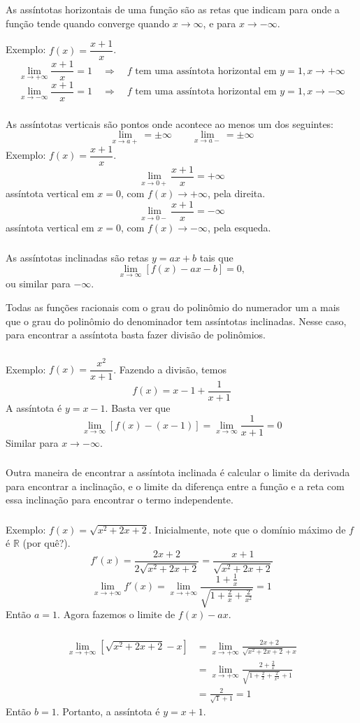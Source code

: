 \documentclass[10 pt]{beamer}
\newcommand{\myframe}[1]{
\begin{frame}
 \frametitle{\insertsection \qquad {\small \insertsubsection}}
#1
\end{frame}}
\newcommand{\limx}[1]{\lim_{x\rightarrow{#1}}}
\begin{document}
\myframe {
  As assíntotas horizontais de uma função são as retas que indicam
  para onde a função tende quando converge quando $x\rightarrow\infty$,
  e para $x\rightarrow-\infty$.

  Exemplo: $f(x) = \dfrac{x+1}{x}$.
  $$ \limx{+\infty}\frac{x+1}{x} = 1 \quad
      \Longrightarrow \quad \mbox{$f$ tem uma assíntota horizontal em } 
        y=1, x\rightarrow+\infty$$
  $$ \limx{-\infty}\frac{x+1}{x} = 1 \quad
      \Longrightarrow \quad \mbox{$f$ tem uma assíntota horizontal em } 
        y=1, x\rightarrow-\infty$$
}

\myframe {
  As assíntotas verticais são pontos onde acontece ao menos um dos seguintes:
  $$ \limx{a+} = \pm\infty \qquad \limx{a-} = \pm\infty $$
  Exemplo: $f(x) = \dfrac{x+1}{x}$.
  $$ \limx{0+}\frac{x+1}{x} = +\infty $$
    assíntota vertical em $x = 0$, com $f(x)\rightarrow+\infty$, pela direita.
  $$ \limx{0-}\frac{x+1}{x} = -\infty $$
    assíntota vertical em $x = 0$, com $f(x)\rightarrow-\infty$, pela esqueda.
}

\myframe {
  As assíntotas inclinadas são retas $y = ax+b$ tais que
  $$ \limx{\infty}[f(x) - ax-b] = 0, $$
  ou similar para $-\infty$.

  Todas as funções racionais com o grau do polinômio do numerador um a mais
  que o grau do polinômio do denominador tem assíntotas inclinadas.
  Nesse caso, para encontrar a assíntota basta fazer divisão de polinômios.
}

\myframe {
  Exemplo: $f(x) = \dfrac{x^2}{x+1}$. Fazendo a divisão, temos
  $$ f(x) = x-1 + \frac{1}{x+1} $$
  A assíntota é $y = x-1$. Basta ver que
  $$ \limx{\infty}[f(x)-(x-1)] = \limx{\infty}\frac{1}{x+1} = 0 $$
  Similar para $x \rightarrow-\infty$.
}

\myframe {
  Outra maneira de encontrar a assíntota inclinada é calcular o limite
  da derivada para encontrar a inclinação, e o limite da diferença
  entre a função e a reta com essa inclinação para encontrar o termo
  independente.
}

\myframe {
  Exemplo: $f(x) = \sqrt{x^2 + 2x + 2}$. Inicialmente, note que o domínio
  máximo de $f$ é $\mathbb{R}$ (por quê?).
  $$ f'(x) = \frac{2x + 2}{2\sqrt{x^2 + 2x + 2}} = \frac{x+1}{\sqrt{x^2+2x+2}} $$
  $$ \limx{+\infty}f'(x) = 
    \limx{+\infty}\frac{1+\frac{1}{x}}{\sqrt{1+\frac{2}{x}+\frac{2}{x^2}}} = 1$$
  Então $a = 1$. Agora fazemos o limite de $f(x) - ax$.
}

\myframe {
  \begin{align*}
    \limx{+\infty} [\sqrt{x^2+2x+2} - x] 
      & = \limx{+\infty} \frac{2x+2}{\sqrt{x^2+2x+2}+x} \\
      & = \limx{+\infty} \frac{2+\frac{2}{x}} 
          {\sqrt{1 + \frac{2}{x} + \frac{2}{x^2}} + 1} \\
      & = \frac{2}{\sqrt{1}+1} = 1
  \end{align*}
  Então $b = 1$. Portanto, a assíntota é $y = x + 1$.
}
\end{document}
